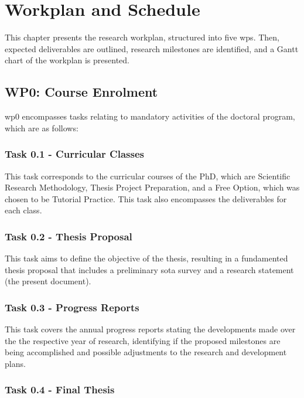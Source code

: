 \chapter{Workplan and Schedule}
\label{chap:workplan-schedule}

\begin{introduction}
This chapter presents the research workplan, structured into five \acp{wp}. Then, expected deliverables are outlined, research milestones are identified, and a Gantt chart of the workplan is presented. 
\end{introduction}

\section{WP0: Course Enrolment}

\ac{wp}0 encompasses tasks relating to mandatory activities of the doctoral program, which are as follows:

\subsection{Task 0.1 - Curricular Classes}

This task corresponds to the curricular courses of the PhD, which are Scientific Research Methodology, Thesis Project Preparation, and a Free Option, which was chosen to be Tutorial Practice. This task also encompasses the deliverables for each class.

\subsection{Task 0.2 - Thesis Proposal}

This task aims to define the objective of the thesis, resulting in a fundamented thesis proposal that includes a preliminary \ac{sota} survey and a research statement (the present document).

\subsection{Task 0.3 - Progress Reports}

This task covers the annual progress reports stating the developments made over the the respective year of research, identifying if the proposed milestones are being accomplished and possible adjustments to the research and development plans. 

\subsection{Task 0.4 - Final Thesis}


